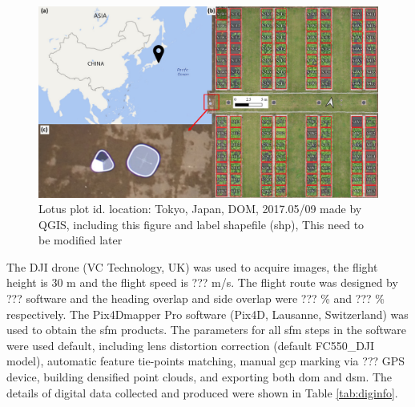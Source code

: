 \documentclass[sensors,article,submit,moreauthors, xelatex]{Definitions/mdpi}
\begin{document}
\begin{figure}[H]
  \centering
  \includegraphics[width=0.95\linewidth]{figures/map.pdf}
  \caption{Lotus plot id. location: Tokyo, Japan, DOM, 2017.05/09 made by QGIS, including this figure and label shapefile (shp), This need to be modified later}
  \label{fig:plotid}
\end{figure}

The DJI drone (VC Technology, UK) was used to acquire images, the flight height is 30 m and the flight speed is ??? m/s. The flight route was designed by ??? software and the heading overlap and side overlap were ??? \% and ??? \% respectively. The Pix4Dmapper Pro software (Pix4D, Lausanne, Switzerland) was used to obtain the \acrshort*{sfm} products. The parameters for all \acrshort*{sfm} steps in the software were used default, including lens distortion correction (default FC550\_DJI model), automatic feature tie-points matching, manual \acrfull*{gcp} marking via ??? GPS device, building densified point clouds, and exporting both \acrshort*{dom} and \acrshort*{dsm}. The details of digital data collected and produced were shown in Table \ref{tab:diginfo}.
\end{document}
